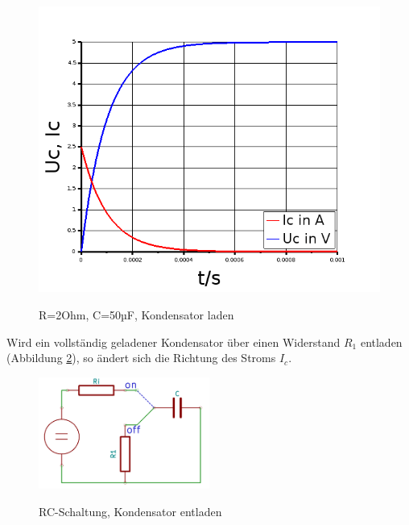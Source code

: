 {{%
      \begin{figure}[H]
        \centering
        \includegraphics[width=\textwidth]{Graphics/KondensatorLadekurve.png}
        \caption{R=2Ohm, C=50µF, Kondensator laden}{}
        \label{charge_capacitor}
      \end{figure}
\noindent Wird ein vollständig geladener Kondensator über einen Widerstand \(R_1\) entladen (Abbildung \ref{discharge_capacitor_circ}), so ändert sich die Richtung des Stroms \(I_c\).

\begin{figure}[H]
  \centering
      \includegraphics[width=0.5\textwidth]{Graphics/RC_circuit_discharge.png}
      \caption{RC-Schaltung, Kondensator entladen}{}
     \label{discharge_capacitor_circ}
\end{figure}

}}
